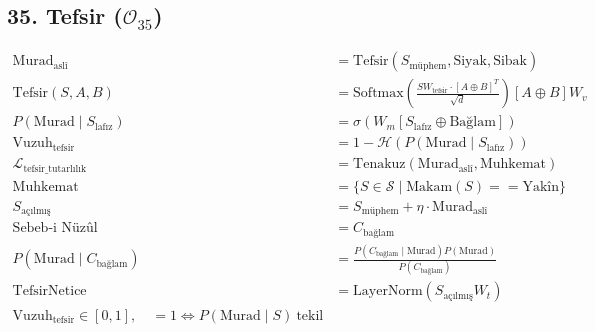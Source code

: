 \documentclass[11pt, a4paper]{article}
\begin{document}
\subsection{35. Tefsir ($\mathcal{O}_{35}$)}
\begin{align}
\text{Murad}_{\text{aslî}} &= \text{Tefsir}(S_{\text{müphem}}, \text{Siyak}, \text{Sibak}) \\
\text{Tefsir}(S, A, B) &= \text{Softmax}\left( \frac{S W_{\text{tefsir}} \cdot [A \oplus B]^T}{\sqrt{d}} \right) [A \oplus B] W_v \\
P(\text{Murad} \mid S_{\text{lafız}}) &= \sigma( W_m [S_{\text{lafız}} \oplus \text{Bağlam}] ) \\
\text{Vuzuh}_{\text{tefsir}} &= 1 - \mathcal{H}(P(\text{Murad} \mid S_{\text{lafız}})) \\
\mathcal{L}_{\text{tefsir\_tutarlılık}} &= \text{Tenakuz}(\text{Murad}_{\text{aslî}}, \text{Muhkemat}) \\
\text{Muhkemat} &= \{ S \in \mathcal{S} \mid \text{Makam}(S) == \text{Yakîn} \} \\
S_{\text{açılmış}} &= S_{\text{müphem}} + \eta \cdot \text{Murad}_{\text{aslî}} \\
\text{Sebeb-i Nüzûl} &= C_{\text{bağlam}} \\
P(\text{Murad} \mid C_{\text{bağlam}}) &= \frac{P(C_{\text{bağlam}} \mid \text{Murad}) P(\text{Murad})}{P(C_{\text{bağlam}})} \\
\text{TefsirNetice} &= \text{LayerNorm}(S_{\text{açılmış}} W_t) \\
\text{Vuzuh}_{\text{tefsir}} \in [0,1], \quad = 1 \iff P(\text{Murad} \mid S) \ \text{tekil}
\end{align}
\end{document}
